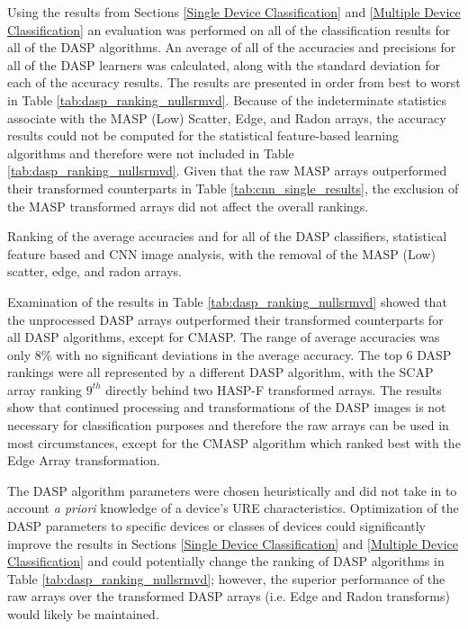 Using the results from Sections \ref{Single Device Classification} and \ref{Multiple Device Classification} an evaluation was performed on all of the classification results for all of the DASP algorithms.  An average of all of the accuracies and precisions for all of the DASP learners was calculated, along with the standard deviation for each of the accuracy results.  The results are presented in order from best to worst in Table \ref{tab:dasp_ranking_nullsrmvd}.  Because of the indeterminate statistics associate with the MASP (Low) Scatter, Edge, and Radon arrays, the accuracy results could not be computed for the statistical feature-based learning algorithms and therefore were not included in Table \ref{tab:dasp_ranking_nullsrmvd}.  Given that the raw MASP arrays outperformed their transformed counterparts in Table \ref{tab:cnn_single_results}, the exclusion of the MASP transformed arrays did not affect the overall rankings. 

\begin{table}[tb]
	\caption{Ranking of the average accuracies and for all of the DASP classifiers, statistical feature based and CNN image analysis, with the removal of the MASP (Low) scatter, edge, and radon arrays.}
	\centering
	\label{tab:dasp_ranking_nullsrmvd}
\end{table}

Examination of the results in Table \ref{tab:dasp_ranking_nullsrmvd} showed that the unprocessed DASP arrays outperformed their transformed counterparts for all DASP algorithms, except for CMASP.  The range of average accuracies was only $8\%$ with no significant deviations in the average accuracy.  The top $6$ DASP rankings were all represented by a different DASP algorithm, with the SCAP array ranking $9^{th}$ directly behind two HASP-F transformed arrays.  The results show that continued processing and transformations of the DASP images is not necessary for classification purposes and therefore the raw arrays can be used in most circumstances, except for the CMASP algorithm which ranked best with the Edge Array transformation.

The DASP algorithm parameters were chosen heuristically and did not take in to account \textit{a priori} knowledge of a device's URE characteristics.  Optimization of the DASP parameters to specific devices or classes of devices could significantly improve the results in Sections \ref{Single Device Classification} and \ref{Multiple Device Classification} and could potentially change the ranking of DASP algorithms in Table \ref{tab:dasp_ranking_nullsrmvd}; however, the superior performance of the raw arrays over the transformed DASP arrays (i.e. Edge and Radon transforms) would likely be maintained.

